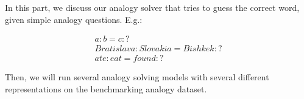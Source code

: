 In this part, we discuss our analogy solver that tries to guess the correct word, given simple analogy questions. E.g.:

\begin{align*}
	a : b = c : ?\\
	Bratislava : Slovakia = Bishkek : ?\\
	ate : eat = found : ?
\end{align*}

Then, we will run several analogy solving models with several different representations on the benchmarking analogy dataset.
